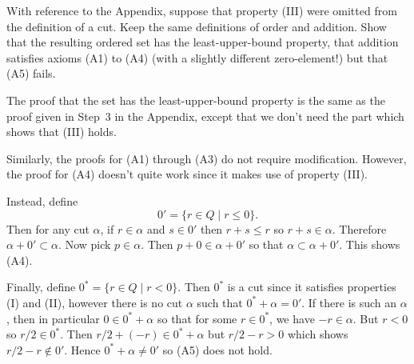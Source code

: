  With reference to the Appendix, suppose that property
(III) were omitted from the definition of a cut. Keep the same
definitions of order and addition. Show that the resulting ordered set
has the least-upper-bound property, that addition satisfies axioms
(A1) to (A4) (with a slightly different zero-element!) but that (A5)
fails.
\begin{solution}
  The proof that the set has the least-upper-bound property is the
  same as the proof given in Step~3 in the Appendix, except that we
  don't need the part which shows that (III) holds.

  Similarly, the proofs for (A1) through (A3) do not require
  modification. However, the proof for (A4) doesn't quite work since
  it makes use of property (III).

  Instead, define
  \begin{equation*}
    0' = \{ r\in Q \mid r \leq 0 \}.
  \end{equation*}
  Then for any cut $\alpha$, if $r\in\alpha$ and $s\in0'$ then
  $r+s\leq r$ so $r+s\in\alpha$. Therefore $\alpha +
  0'\subset\alpha$. Now pick $p\in\alpha$. Then $p + 0\in\alpha + 0'$
  so that $\alpha\subset\alpha + 0'$. This shows (A4).

  Finally, define $0^* = \{r\in Q\mid r < 0\}$. Then $0^*$ is a cut
  since it satisfies properties (I) and (II), however there is no cut
  $\alpha$ such that $0^* + \alpha = 0'$. If there is such an
  $\alpha$, then in particular $0\in0^* + \alpha$ so that for some
  $r\in0^*$, we have $-r\in\alpha$. But $r < 0$ so $r/2\in0^*$. Then
  $r/2 + (-r) \in 0^* + \alpha$ but $r/2 - r > 0$ which shows
  $r/2 - r\not\in0'$. Hence $0^* + \alpha \neq 0'$ so (A5) does not
  hold.
\end{solution}
